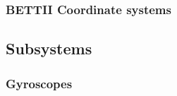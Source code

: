 \subsubsection{BETTII Coordinate systems}


\begin{figure}[!ht]
	\centering
	
	\caption[BETTII coordinate systems]{}
	\label{fig:CoordinateSystem}
    \end{figure}

    
% 	


\begin{figure}[!ht]
	\centering
	
	\caption[The celestial sphere]{}
	\label{fig:celestialSphere}
    \end{figure}

\begin{figure}[!ht]
	\centering
	
	\caption[The star camera reference frame]{}
	\label{fig:starcamRefFrame}
    \end{figure}


\subsection{Subsystems}



\subsubsection{Gyroscopes}

